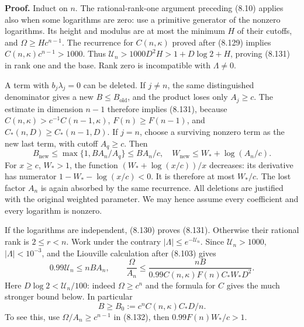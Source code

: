 \documentclass[
  11pt,
  a4paper,
]{article}
\begin{document}
\textbf{Proof.} Induct on \(n\). The rational-rank-one argument
preceding (8.10) applies also when some logarithms are zero: use a
primitive generator of the nonzero logarithms. Its height and modulus
are at most the minimum \(H\) of their cutoffs, and
\(\Omega\ge Hc^{n-1}\). The recurrence for \(C(n,\kappa)\) proved after
(8.129) implies \(C(n,\kappa)c^{n-1}>1000\). Thus
\(\mathcal U_n>1000D^2H>
1+D\log2+H\), proving (8.131) in rank one and the base. Rank zero is
incompatible with \(\Lambda\ne0\).

A term with \(b_j\lambda_j=0\) can be deleted. If \(j\ne n\), the same
distinguished denominator gives a new \(B\le B_{\mathrm{old}}\), and the
product loses only \(A_j\ge c\). The estimate in dimension \(n-1\)
therefore implies (8.131), because \(C(n,\kappa)>c^{-1}C(n-1,\kappa)\),
\(F(n)\ge F(n-1)\), and \(C_*(n,D)\ge C_*(n-1,D)\). If \(j=n\), choose a
surviving nonzero term as the new last term, with cutoff \(A_q\ge c\).
Then \[
B_{\mathrm{new}}\le\max\{1,BA_n/A_q\}\le BA_n/c,
\quad
W_{\mathrm{new}}\le W_*+\log(A_n/c).
\] For \(x\ge c\), \(W_*>1\), the function \((W_*+\log(x/c))/x\)
decreases: its derivative has numerator \(1-W_*-\log(x/c)<0\). It is
therefore at most \(W_*/c\). The lost factor \(A_n\) is again absorbed
by the same recurrence. All deletions are justified with the original
weighted parameter. We may hence assume every coefficient and every
logarithm is nonzero.

If the logarithms are independent, (8.130) proves (8.131). Otherwise
their rational rank is \(2\le r<n\). Work under the contrary
\(|\Lambda|\le e^{-\mathcal U_n}\). Since \(\mathcal U_n>1000\),
\(|\Lambda|<10^{-3}\), and the Liouville calculation after (8.103) gives
\[
0.99\mathcal U_n\le nBA_n,\qquad
\frac{\Omega}{A_n}\le
\frac{nB}{0.99C(n,\kappa)F(n)C_*W_*D^2}.
\tag{8.132}
\] Here \(D\log2<\mathcal U_n/100\): indeed \(\Omega\ge c^n\) and the
formula for \(C\) gives the much stronger bound below. In particular \[
B\ge B_0:=c^nC(n,\kappa)C_*D/n.
\tag{8.133}
\] To see this, use \(\Omega/A_n\ge c^{n-1}\) in (8.132), then
\(0.99F(n)W_*/c>1\).
\end{document}
